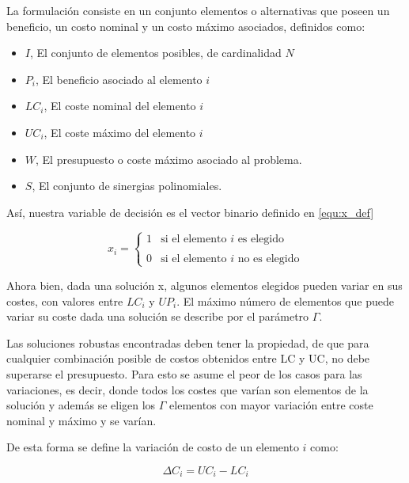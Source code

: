 \documentclass[spanish, a4paper, 12pt, openany,final]{book}
\begin{document}
    La formulación consiste en un conjunto elementos o alternativas que poseen un beneficio, un costo nominal y un costo máximo asociados, definidos como:
    
    \begin{itemize}
    	\item $I$, El conjunto de elementos posibles, de cardinalidad $N$
    	\item $P_i$, El beneficio asociado al elemento $i$ %
    	\item $LC_i$, El coste nominal del elemento $i$    %
    	\item $UC_i$, El coste máximo del elemento $i$     %
    	\item $W$, El presupuesto o coste máximo asociado al problema.
    	\item $S$, El conjunto de sinergias polinomiales.
    \end{itemize}
    
    Así, nuestra variable de decisión es el vector binario definido en \ref{equ:x_def}
    
    \begin{equation}
    	\label{equ:x_def}
    	x_i = \left\{ 
    	\begin{array}{lc}
    		1 & \text{si el elemento $i$ es elegido}\\ \\ 
    		0 &  \text{si el elemento $i$ no es elegido}
    	\end{array} \right.
    \end{equation}
    
    Ahora bien, dada una solución x, algunos elementos elegidos pueden variar en sus costes, con valores entre $LC_i$ y $UP_i$. El máximo número de elementos que puede variar su coste dada una solución se describe por el parámetro $\Gamma$.
    
    Las soluciones robustas encontradas deben tener la propiedad, de que para cualquier combinación posible de costos obtenidos entre LC y UC, no debe superarse el presupuesto. Para esto se asume el peor de los casos para las variaciones, es decir, donde todos los costes que varían son elementos de la solución y además se eligen los $\Gamma$ elementos con mayor variación entre coste nominal y máximo y se varían.
    
    De esta forma se define la variación de costo de un elemento $i$ como:
    
    $$
    \Delta C_i  = UC_i - LC_i
    $$
    
\end{document}
